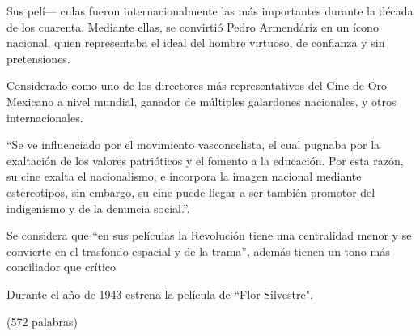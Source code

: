     \begin{compactitem}
    \item Sus pelí--- culas fueron internacionalmente las más importantes durante la década de los cuarenta. Mediante ellas, se convirtió Pedro Armendáriz en un ícono nacional, quien  representaba el ideal del hombre virtuoso, de confianza y sin pretensiones.\autocite[522]{peter_desarrollo_2008}
    \item Considerado como uno de los directores más representativos del Cine de Oro Mexicano a nivel mundial, ganador de múltiples galardones nacionales, y otros  internacionales. \autocite[9]{aguilar_construccion_2014}
    \item ``Se ve influenciado por el movimiento vasconcelista, el cual pugnaba por la exaltación de los valores patrióticos y el fomento a la educación. Por esta razón, su cine exalta el nacionalismo, e incorpora la imagen nacional mediante estereotipos, sin embargo, su cine puede llegar a ser también promotor del indigenismo y de la denuncia social.''\autocite[9-10]{aguilar_construccion_2014}.
    \item Se considera que ``en sus películas la Revolución tiene una centralidad menor y se convierte en el
    trasfondo espacial y  de la trama''\autocite[111]{piedras_narrativas_2012}, además tienen un tono más conciliador que crítico\autocite{piedras_narrativas_2012}
    \item Durante el año de 1943 estrena la película de ``Flor
    Silvestre"\autocite{fernandez_flor_1946}.\autocite{_flor_????}
    \end{compactitem} 

(572 palabras)
\pagebreak

